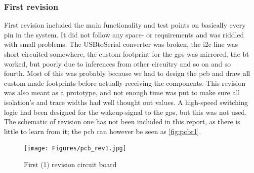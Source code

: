 \subsubsection{First revision}
First revision included the main functionality and test points on basically every pin in the system. It did not follow any space- or requirements and was riddled with small problems. The USBtoSerial converter was broken, the \gls{i2c} line was short circuited somewhere, the custom footprint for the \gls{gps} was mirrored, the \gls{bt} worked, but poorly due to inferences from other circuitry and so on and so fourth. Most of this was probably because we had to design the \gls{pcb} and draw all custom made footprints before actually receiving the components. This revision was also meant as a prototype, and not enough time was put to make sure all isolation's and trace widths had well thought out values. A high-speed switching logic had been designed for the wakeup-signal to the \gls{gps}, but this was not used. The schematic of revision one has not been included in this report, as there is little to learn from it; the \gls{pcb} can however be seen as \autoref{fig:pcbr1}.
\begin{figure}[tbh]
	\centering
    \texttt{[image: Figures/pcb\_rev1.jpg]}
	\caption{First (1) revision circuit board}
	\label{fig:pcbr1}
\end{figure}

